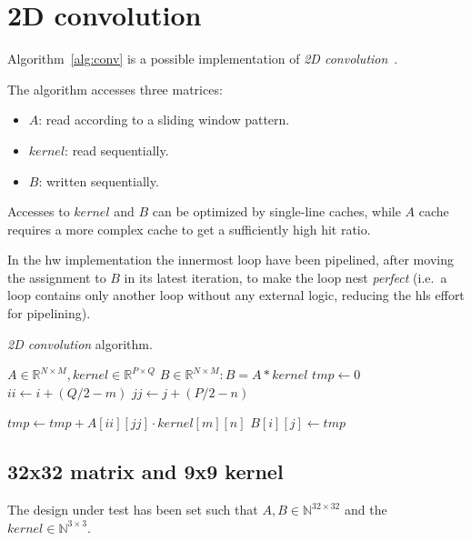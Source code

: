 \documentclass[11pt,a4paper,oneside]{memoir}
\begin{document}

\section{2D convolution}
Algorithm~\ref{alg:conv} is a possible implementation of \emph{2D
convolution}~\cite{conv}.

The algorithm accesses three matrices:
\begin{itemize}
	\item $A$: read according to a sliding window pattern.
	\item $kernel$: read sequentially.
	\item $B$: written sequentially.
\end{itemize}

Accesses to $kernel$ and $B$ can be optimized by single-line caches, while $A$
cache requires a more complex cache to get a sufficiently high hit ratio.

In the \acl{hw} implementation the innermost loop have been pipelined, after
moving the assignment to $B$ in its latest iteration, to make the loop nest
\emph{perfect} (i.e.\ a loop contains only another loop without any external
logic, reducing the \ac{hls} effort for pipelining).

\begin{algorithm}
	\caption{\emph{2D convolution} algorithm.}\label{alg:conv}
	\begin{algorithmic}
		\Require $A \in \mathbb{R}^{N \times M},
		kernel \in \mathbb{R}^{P \times Q}$
		\Ensure $B \in \mathbb{R}^{N \times M} : B = A \ast kernel$
					\State $tmp \gets 0$
							\State $ii \gets i + (Q / 2 - m)$
							\State $jj \gets j + (P / 2 - n)$

								\State $tmp \gets
									tmp + A[ii][jj] \cdot
									kernel[m][n]$
							\EndIf
						\EndFor
					\EndFor
					\State $B[i][j] \gets tmp$
				\EndFor
			\EndFor
		\EndProcedure
	\end{algorithmic}
\end{algorithm}

\subsection{32x32 matrix and 9x9 kernel}
The design under test has been set such that $A, B \in \mathbb{N}^{32 \times
32}$ and the $kernel \in \mathbb{N}^{3 \times 3}$.
\end{document}

